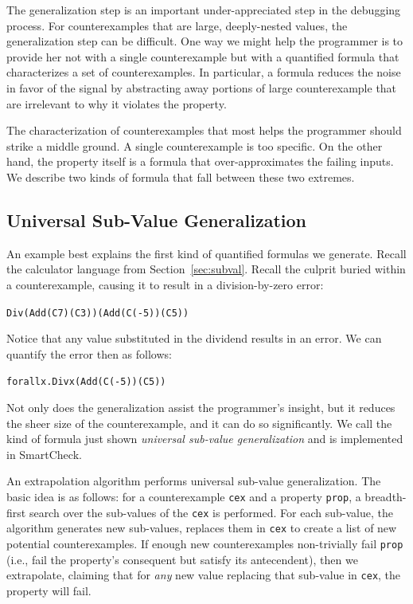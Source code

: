 \documentclass[10pt]{sigplanconf}
\newenvironment{code}{\begin{alltt}}{\end{alltt}}
\newcommand{\ttp}[1]{\texttt{#1}}
\begin{document}
The generalization step is an important under-appreciated step in the debugging
process.  For counterexamples that are large, deeply-nested values, the
generalization step can be difficult.  One way we might help the programmer is
to provide her not with a single counterexample but with a quantified formula
that characterizes a set of counterexamples.  In particular, a formula reduces
the noise in favor of the signal by abstracting away portions of large
counterexample that are irrelevant to why it violates the property.

The characterization of counterexamples that most helps the programmer should
strike a middle ground.  A single counterexample is too specific.  On the other
hand, the property itself is a formula that over-approximates the failing
inputs.  We describe two kinds of formula that fall between these two extremes.

\subsection{Universal Sub-Value Generalization}\label{sec:universal}
An example best explains the first kind of quantified formulas we generate.
Recall the calculator language from Section~\ref{sec:subval}.  Recall the
culprit buried within a counterexample, causing it to result in a
division-by-zero error:
%
\begin{code}
Div (Add (C 7) (C 3)) (Add (C (-5)) (C 5))
\end{code}
%
\noindent
Notice that any value substituted in the dividend results in an error.  We can
quantify the error then as follows:
%
\begin{code}
forall x . Div x (Add (C (-5)) (C 5))
\end{code}
%
\noindent
Not only does the generalization assist the programmer's insight, but it reduces
the sheer size of the counterexample, and it can do so significantly.  We call
the kind of formula just shown \emph{universal sub-value generalization} and is
implemented in SmartCheck.

An extrapolation algorithm performs universal sub-value generalization.  The
basic idea is as follows: for a counterexample \ttp{cex} and a property
\ttp{prop}, a breadth-first search over the sub-values of the \ttp{cex} is
performed.  For each sub-value, the algorithm generates new sub-values, replaces
them in \ttp{cex} to create a list of new potential counterexamples.  If enough
new counterexamples non-trivially fail \ttp{prop} (i.e., fail the property's
consequent but satisfy its antecendent), then we extrapolate, claiming that for
\emph{any} new value replacing that sub-value in \ttp{cex}, the property will
fail.
\end{document}
